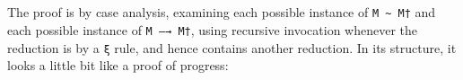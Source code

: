 \begin{fence}
\begin{code}
\>[2]\AgdaSpace{}%
\AgdaSpace{}%
\AgdaSpace{}%
\<%
\\
\>[0]%
\>[5]\AgdaSymbol{|}\AgdaSpace{}%
\AgdaSpace{}%
\AgdaSpace{}%
%
\>[36]\AgdaSymbol{=}%
\>[39]\AgdaSpace{}%
\AgdaSymbol{(}\AgdaSpace{}%
\AgdaSpace{}%
\AgdaSymbol{)}\AgdaSpace{}%
\AgdaSymbol{(}\AgdaSpace{}%
\AgdaSpace{}%
\AgdaSymbol{)}\<%
\\
\>[0]\AgdaSpace{}%
\AgdaSymbol{(}\AgdaSpace{}%
\AgdaSpace{}%
\AgdaSymbol{)}%
\>[20]\AgdaSymbol{(}\AgdaSpace{}%
\AgdaSymbol{)}%
\>[36]\AgdaSymbol{=}%
\>[39]\AgdaSpace{}%
\AgdaSymbol{(}\AgdaSpace{}%
\AgdaSpace{}%
\AgdaSymbol{)}%
\>[57]\AgdaSymbol{(}\AgdaSpace{}%
\AgdaSymbol{(}\AgdaSpace{}%
\AgdaSpace{}%
\AgdaSymbol{))}\<%
\end{code}
\end{fence}

The proof is by case analysis, examining each possible instance of
\texttt{M\ \textasciitilde{}\ M†} and each possible instance of
\texttt{M\ —→\ M†}, using recursive invocation whenever the reduction is
by a \texttt{ξ} rule, and hence contains another reduction. In its
structure, it looks a little bit like a proof of progress:

